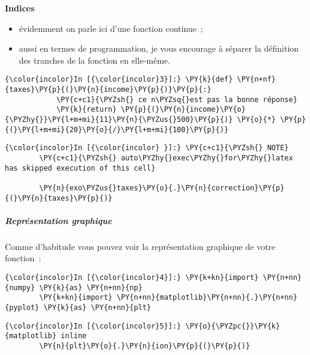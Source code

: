     \textbf{Indices}

\begin{itemize}
\tightlist
\item
  évidemment on parle ici d'une fonction continue~;
\item
  aussi en termes de programmation, je vous encourage à séparer la
  définition des tranches de la fonction en elle-même.
\end{itemize}

    \begin{Verbatim}[commandchars=\\\{\},frame=single,framerule=0.3mm,rulecolor=\color{cellframecolor}]
{\color{incolor}In [{\color{incolor}3}]:} \PY{k}{def} \PY{n+nf}{taxes}\PY{p}{(}\PY{n}{income}\PY{p}{)}\PY{p}{:}
            \PY{c+c1}{\PYZsh{} ce n\PYZsq{}est pas la bonne réponse}
            \PY{k}{return} \PY{p}{(}\PY{n}{income}\PY{o}{\PYZhy{}}\PY{l+m+mi}{11}\PY{n}{\PYZus{}500}\PY{p}{)} \PY{o}{*} \PY{p}{(}\PY{l+m+mi}{20}\PY{o}{/}\PY{l+m+mi}{100}\PY{p}{)}
\end{Verbatim}


    \begin{Verbatim}[commandchars=\\\{\},frame=single,framerule=0.3mm,rulecolor=\color{cellframecolor}]
{\color{incolor}In [{\color{incolor} }]:} \PY{c+c1}{\PYZsh{} NOTE}
        \PY{c+c1}{\PYZsh{} auto\PYZhy{}exec\PYZhy{}for\PYZhy{}latex has skipped execution of this cell}
        
        \PY{n}{exo\PYZus{}taxes}\PY{o}{.}\PY{n}{correction}\PY{p}{(}\PY{n}{taxes}\PY{p}{)}
\end{Verbatim}


    \hypertarget{repruxe9sentation-graphique}{%
\subparagraph{Représentation
graphique}\label{repruxe9sentation-graphique}}

    Comme d'habitude vous pouvez voir la représentation graphique de votre
fonction~:

    \begin{Verbatim}[commandchars=\\\{\},frame=single,framerule=0.3mm,rulecolor=\color{cellframecolor}]
{\color{incolor}In [{\color{incolor}4}]:} \PY{k+kn}{import} \PY{n+nn}{numpy} \PY{k}{as} \PY{n+nn}{np}
        \PY{k+kn}{import} \PY{n+nn}{matplotlib}\PY{n+nn}{.}\PY{n+nn}{pyplot} \PY{k}{as} \PY{n+nn}{plt}
\end{Verbatim}


    \begin{Verbatim}[commandchars=\\\{\},frame=single,framerule=0.3mm,rulecolor=\color{cellframecolor}]
{\color{incolor}In [{\color{incolor}5}]:} \PY{o}{\PYZpc{}}\PY{k}{matplotlib} inline
        \PY{n}{plt}\PY{o}{.}\PY{n}{ion}\PY{p}{(}\PY{p}{)}
\end{Verbatim}


